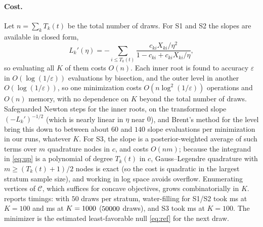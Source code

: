 \documentclass[11pt]{article}
\newcommand{\calC}{\mathcal{C}}
\theoremstyle{plain}
\theoremstyle{definition}
\theoremstyle{remark}
\begin{document}
\paragraph{Cost.}  Let $n=\sum_kT_k(t)$ be the total number of draws.  For S1 and S2 the slopes are available in closed
form,
\[
L_k'(\eta)=-\sum_{i\le T_k(t)}\frac{c_{ki}X_{ki}/\eta^2}{1-c_{ki}+c_{ki}X_{ki}/\eta},
\]
so evaluating all $K$ of them costs $O(n)$.  Each inner root is found to accuracy $\varepsilon$ in $O(\log(1/\varepsilon))$ evaluations by bisection, and the
outer level in another $O(\log(1/\varepsilon))$, so one minimization costs $O(n\log^2(1/\varepsilon))$ operations and $O(n)$
memory, with no dependence on $K$ beyond the total number of draws.  Safeguarded Newton steps for the inner roots, on
the transformed slope $(-L_k')^{-1/2}$ (which is nearly linear in $\eta$ near $0$), and Brent's method for the level
bring this down to between about $60$ and $140$ slope evaluations per minimization in our runs, whatever $K$.  For S3, the slope is a
posterior-weighted average of such terms over $m$ quadrature nodes in $c$, and costs $O(nm)$; because the integrand in
\eqref{eq:up} is a polynomial of degree $T_k(t)$ in $c$, Gauss--Legendre quadrature with $m\ge(T_k(t)+1)/2$ nodes is exact
(so the cost is quadratic in the largest stratum sample size), and working in log space avoids overflow.  Enumerating vertices of $\calC$, which suffices for concave objectives, grows
combinatorially in $K$.   reports timings: with $50$ draws per stratum, water-filling for S1/S2
took \timewfKhundred{} ms at $K=100$ and \timewfKmax{} ms at $K=1000$ ($50000$ draws), and S3 took
\timeupKhundred{} ms at $K=100$.  The minimizer is the estimated least-favorable null \eqref{eq:ref} for the next draw.

\begin{table}[t]
  \centering\small
  \caption{Time for one minimization of a convex UI-TS objective over $\calC$ (median of \repsG{} problems), with
  $50$ draws per stratum, Dirichlet$(5,\ldots,5)$ weights, and Beta strata with means drawn uniformly from $[0.5,0.8]$.
  S1/S2: the fractions of S2 at $\eta_0$; S3: the UP mixture.  Interior point: \texttt{cvxopt.solvers.cp} with exact
  gradients and Hessians and default settings; ``converged'' counts problems for which it reported an optimal solution,
  and its times are medians over those.  Where it converged, the two minima agreed to within \timediffmax{} in
  log-wealth.  Single core, Python/NumPy.}
  \label{tab:timing}
  
\end{table}
\end{document}
